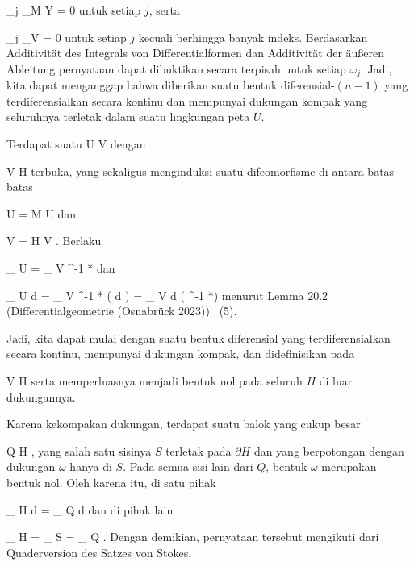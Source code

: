 {{\mavergleichskette
{\vergleichskette
{ \omega_j \vert_{M \setminus Y}
}
{ = }{ 0
}
{ }{
}
{ }{
}
{ }{
}
}
{}{}{}
untuk setiap $j$, serta

\mavergleichskettedisp
{\vergleichskette
{ \omega_j \vert_V
}
{ =} { 0
}
{ } {
}
{ } {
}
{ } {
}
}
{}{}{}
untuk setiap $j$ kecuali berhingga banyak indeks. Berdasarkan
Additivität des Integrals von Differentialformen
dan
Additivität der äußeren Ableitung
pernyataan dapat dibuktikan secara terpisah untuk setiap $\omega_j$. Jadi, kita dapat menganggap bahwa diberikan suatu bentuk diferensial-$(n-1)$ yang terdiferensialkan secara kontinu dan mempunyai dukungan kompak yang seluruhnya terletak dalam suatu lingkungan peta $U$.}
{}
\teilbeweis {}{}{}
{Terdapat suatu
\maabb {\alpha} { U } { V
} {}
dengan

\mavergleichskette
{\vergleichskette
{ V
}
{ \subseteq }{ H
}
{ }{
}
{ }{
}
{ }{
}
}
{}{}{}
terbuka, yang sekaligus menginduksi suatu difeomorfisme di antara batas-batas

\mavergleichskette
{\vergleichskette
{ \partial U
}
{ = }{ \partial M \cap U
}
{  }{
}
{    }{
}
{   }{
}
}
{}{}{}
dan

\mavergleichskette
{\vergleichskette
{ \partial V
}
{ = }{ \partial H \cap V
}
{  }{
}
{    }{
}
{   }{
}
}
{}{}{}
. Berlaku

\mavergleichskettedisp
{\vergleichskette
{
\int_{ \partial U } \omega
}
{ = } {
\int_{ \partial V } \alpha^{-1 *}\omega
}
{ } {
}
{ } {
}
{ } {
}
}
{}{}{}
dan

\mavergleichskettedisp
{\vergleichskette
{
\int_{ U  }  d \omega
}
{ =} {
\int_{ V  }  \alpha^{-1 *} (  d \omega)
}
{ =} {
\int_{  V  }  d \left(  \alpha^{-1 *}\omega  \right)
}
{ } {
}
{ } {
}
}
{}{}{}
menurut
Lemma 20.2 (Differentialgeometrie (Osnabrück 2023))  (5).}
{\leerzeichen{}Jadi, kita dapat mulai dengan suatu bentuk diferensial yang terdiferensialkan secara kontinu, mempunyai dukungan kompak, dan didefinisikan pada

\mavergleichskette
{\vergleichskette
{ V
}
{ \subseteq }{ H
}
{ }{
}
{ }{
}
{ }{
}
}
{}{}{}
serta memperluasnya menjadi bentuk nol pada seluruh $H$ di luar dukungannya.}
\teilbeweis {}{}{}
{Karena kekompakan dukungan, terdapat suatu balok yang cukup besar

\mavergleichskette
{\vergleichskette
{ Q
}
{ \subseteq }{ H
}
{ }{
}
{ }{
}
{ }{
}
}
{}{}{,}
yang salah satu sisinya $S$ terletak pada $\partial H$ dan yang berpotongan dengan dukungan $\omega$ hanya di $S$. Pada semua sisi lain dari $Q$, bentuk $\omega$
 {} {}
merupakan bentuk nol. Oleh karena itu, di satu pihak

\mavergleichskettedisp
{\vergleichskette
{
\int_{ H } d\omega
}
{ =} {
\int_{ Q } d\omega
}
{ } {
}
{ } {
}
{ } {
}
}
{}{}{}
dan di pihak lain

\mavergleichskettedisp
{\vergleichskette
{
\int_{ \partial H } \omega
}
{ = } {
\int_{ S } \omega
}
{ = } {
\int_{ \partial Q } \omega
}
{ } {
}
{ } {
}
}
{}{}{.}
Dengan demikian, pernyataan tersebut mengikuti dari Quaderversion des Satzes von Stokes.}
{}

 }
